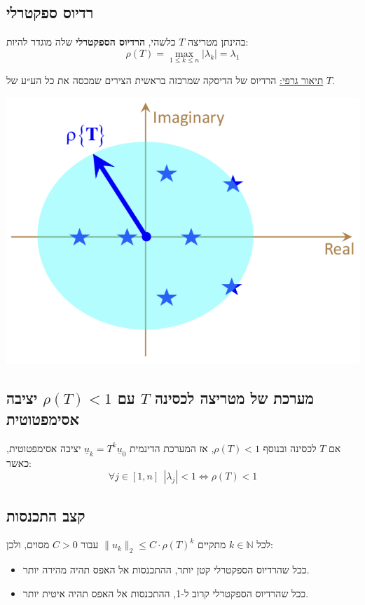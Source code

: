 \documentclass[11pt]{article}
\begin{document}
\subsection{רדיוס ספקטרלי}
\label{sec:org491fa35}
בהינתן מטריצה \(T\) כלשהי, \textbf{הרדיוס הספקטרלי} שלה מוגדר להיות:
\[
\rho \left( T \right) = \max_{1 \le k \le n} \left| \lambda_k \right| = \lambda_1
\]

\uline{תיאור גרפי:} הרדיוס של הדיסקה שמרכזה בראשית הצירים שמכסה את כל הע״ע של \(T\).
\begin{center}
\includegraphics[width=.9\linewidth]{./img/specral-radius-disc.png}
\end{center}

\subsection{מערכת של מטריצה לכסינה \(T\) עם \(\rho \left( T \right) < 1\) יציבה אסימפטוטית}
\label{sec:orgc008bb2}

אם \(T\) לכסינה ובנוסף \(\rho \left( T \right) < 1\), אז המערכת הדינמית \(\underline{u}_k = T^k\underline{u}_0\) יציבה אסימפטוטית, כאשר:
\[
\forall j \in \left[ 1, n \right]\ \ \left| \lambda_j \right| < 1
\iff
\rho \left( T \right) < 1
\]

\subsection{קצב התכנסות}
\label{sec:org11171b3}
לכל \(k \in \mathbb{N}\) מתקיים \(\|u_k\|_2 \le C \cdot \rho \left( T \right)^k\) עבור \(C>0\) מסוים, ולכן:
\begin{itemize}
\item ככל שהרדיוס הספקטרלי קטן יותר, ההתכנסות אל האפס תהיה מהירה יותר.
\item ככל שהרדיוס הספקטרלי קרוב ל-1, ההתכנסות אל האפס תהיה איטית יותר.
\end{itemize}
\end{document}
